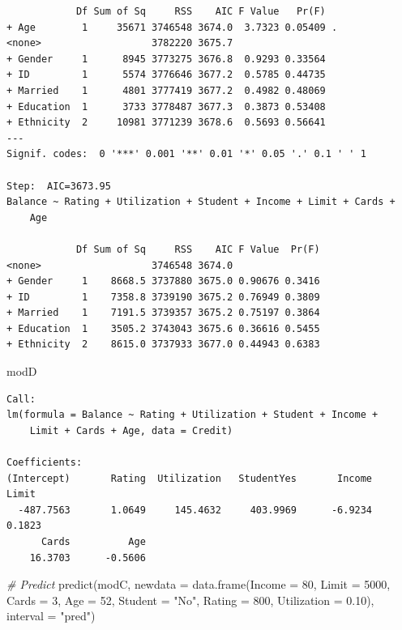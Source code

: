 \documentclass[
]{article}
\newenvironment{Shaded}{\begin{snugshade}}{\end{snugshade}}
\newcommand{\AttributeTok}[1]{\textcolor[rgb]{0.77,0.63,0.00}{#1}}
\newcommand{\CommentTok}[1]{\textcolor[rgb]{0.56,0.35,0.01}{\textit{#1}}}
\newcommand{\DecValTok}[1]{\textcolor[rgb]{0.00,0.00,0.81}{#1}}
\newcommand{\FloatTok}[1]{\textcolor[rgb]{0.00,0.00,0.81}{#1}}
\newcommand{\FunctionTok}[1]{\textcolor[rgb]{0.00,0.00,0.00}{#1}}
\newcommand{\NormalTok}[1]{#1}
\newcommand{\StringTok}[1]{\textcolor[rgb]{0.31,0.60,0.02}{#1}}
\begin{document}
\begin{verbatim}
            Df Sum of Sq     RSS    AIC F Value   Pr(F)  
+ Age        1     35671 3746548 3674.0  3.7323 0.05409 .
<none>                   3782220 3675.7                  
+ Gender     1      8945 3773275 3676.8  0.9293 0.33564  
+ ID         1      5574 3776646 3677.2  0.5785 0.44735  
+ Married    1      4801 3777419 3677.2  0.4982 0.48069  
+ Education  1      3733 3778487 3677.3  0.3873 0.53408  
+ Ethnicity  2     10981 3771239 3678.6  0.5693 0.56641  
---
Signif. codes:  0 '***' 0.001 '**' 0.01 '*' 0.05 '.' 0.1 ' ' 1

Step:  AIC=3673.95
Balance ~ Rating + Utilization + Student + Income + Limit + Cards + 
    Age

            Df Sum of Sq     RSS    AIC F Value  Pr(F)
<none>                   3746548 3674.0               
+ Gender     1    8668.5 3737880 3675.0 0.90676 0.3416
+ ID         1    7358.8 3739190 3675.2 0.76949 0.3809
+ Married    1    7191.5 3739357 3675.2 0.75197 0.3864
+ Education  1    3505.2 3743043 3675.6 0.36616 0.5455
+ Ethnicity  2    8615.0 3737933 3677.0 0.44943 0.6383
\end{verbatim}

\begin{Shaded}
\begin{Highlighting}[]
\NormalTok{modD}
\end{Highlighting}
\end{Shaded}

\begin{verbatim}
Call:
lm(formula = Balance ~ Rating + Utilization + Student + Income + 
    Limit + Cards + Age, data = Credit)

Coefficients:
(Intercept)       Rating  Utilization   StudentYes       Income        Limit  
  -487.7563       1.0649     145.4632     403.9969      -6.9234       0.1823  
      Cards          Age  
    16.3703      -0.5606  
\end{verbatim}

\begin{Shaded}
\begin{Highlighting}[]
\CommentTok{\# Predict}
\FunctionTok{predict}\NormalTok{(modC, }\AttributeTok{newdata =} \FunctionTok{data.frame}\NormalTok{(}\AttributeTok{Income =} \DecValTok{80}\NormalTok{, }\AttributeTok{Limit =} \DecValTok{5000}\NormalTok{, }\AttributeTok{Cards =} \DecValTok{3}\NormalTok{, }\AttributeTok{Age =} \DecValTok{52}\NormalTok{, }\AttributeTok{Student =} \StringTok{"No"}\NormalTok{, }\AttributeTok{Rating =} \DecValTok{800}\NormalTok{, }\AttributeTok{Utilization =} \FloatTok{0.10}\NormalTok{), }\AttributeTok{interval =} \StringTok{"pred"}\NormalTok{)}
\end{Highlighting}
\end{Shaded}
\end{document}
